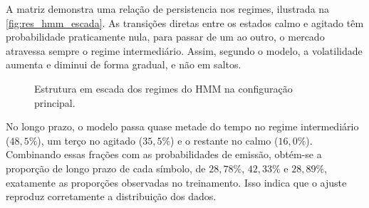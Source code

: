 \documentclass[
    12pt,                %
    openright,           %
    oneside,             %
    a4paper,             %
    english,             %
    brazil               %
]{abntex2}
\begin{document}
A matriz demonstra uma relação de persistencia nos regimes, ilustrada na \autoref{fig:res_hmm_escada}. As transições diretas entre os estados calmo e agitado 
têm probabilidade praticamente nula, para passar de um ao outro, o mercado atravessa sempre o regime intermediário. Assim, segundo o modelo, a 
volatilidade aumenta e diminui de forma gradual, e não em saltos.

\begin{figure}[htbp]
    \centering
    \caption{Estrutura em escada dos regimes do HMM na configuração principal.}
    \label{fig:res_hmm_escada}
\end{figure}

No longo prazo, o modelo passa quase metade do tempo no regime intermediário ($48{,}5\%$), um terço no agitado ($35{,}5\%$) e o 
restante no calmo ($16{,}0\%$). Combinando essas frações com as probabilidades de emissão, obtém-se a proporção de longo prazo de cada símbolo, 
de $28{,}78\%$, $42{,}33\%$ e $28{,}89\%$, exatamente as proporções observadas no treinamento. Isso indica que o ajuste reproduz corretamente a 
distribuição dos dados.
\end{document}
